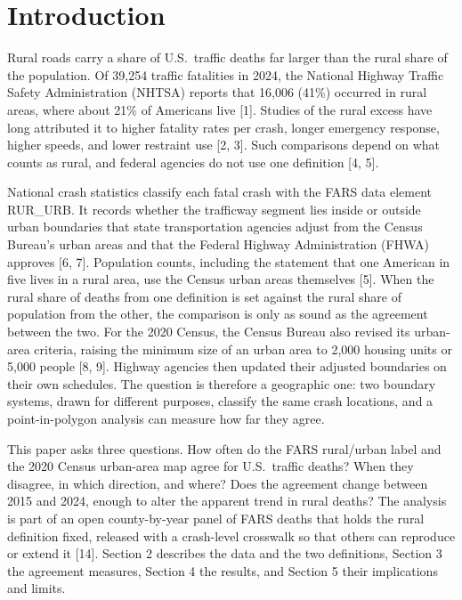 \documentclass{article}
\begin{document}
\section{Introduction}

Rural roads carry a share of U.S.\ traffic deaths far larger than the rural share of the population. Of 39{,}254 traffic fatalities in 2024, the National Highway Traffic Safety Administration (NHTSA) reports that 16{,}006 (41\%) occurred in rural areas, where about 21\% of Americans live [1]. Studies of the rural excess have long attributed it to higher fatality rates per crash, longer emergency response, higher speeds, and lower restraint use [2, 3]. Such comparisons depend on what counts as rural, and federal agencies do not use one definition [4, 5].

National crash statistics classify each fatal crash with the FARS data element RUR\_URB. It records whether the trafficway segment lies inside or outside urban boundaries that state transportation agencies adjust from the Census Bureau's urban areas and that the Federal Highway Administration (FHWA) approves [6, 7]. Population counts, including the statement that one American in five lives in a rural area, use the Census urban areas themselves [5]. When the rural share of deaths from one definition is set against the rural share of population from the other, the comparison is only as sound as the agreement between the two. For the 2020 Census, the Census Bureau also revised its urban-area criteria, raising the minimum size of an urban area to 2{,}000 housing units or 5{,}000 people [8, 9]. Highway agencies then updated their adjusted boundaries on their own schedules. The question is therefore a geographic one: two boundary systems, drawn for different purposes, classify the same crash locations, and a point-in-polygon analysis can measure how far they agree.

This paper asks three questions. How often do the FARS rural/urban label and the 2020 Census urban-area map agree for U.S.\ traffic deaths? When they disagree, in which direction, and where? Does the agreement change between 2015 and 2024, enough to alter the apparent trend in rural deaths? The analysis is part of an open county-by-year panel of FARS deaths that holds the rural definition fixed, released with a crash-level crosswalk so that others can reproduce or extend it [14]. Section 2 describes the data and the two definitions, Section 3 the agreement measures, Section 4 the results, and Section 5 their implications and limits.
\end{document}
